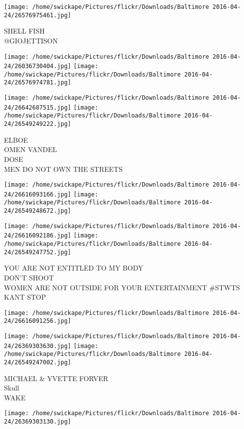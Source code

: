 \documentclass[10pt,letterpaper]{article}
\begin{document}
\vspace{0.25in}
\texttt{[image: /home/swickape/Pictures/flickr/Downloads/Baltimore 2016-04-24/26576975461.jpg]}

SHELL FISH\\
@GIOJETTISON
\pagebreak

\texttt{[image: /home/swickape/Pictures/flickr/Downloads/Baltimore 2016-04-24/26036730404.jpg]}
\texttt{[image: /home/swickape/Pictures/flickr/Downloads/Baltimore 2016-04-24/26576974781.jpg]}

\texttt{[image: /home/swickape/Pictures/flickr/Downloads/Baltimore 2016-04-24/26642687515.jpg]}
\texttt{[image: /home/swickape/Pictures/flickr/Downloads/Baltimore 2016-04-24/26549249222.jpg]}

ELBOE\\
OMEN VANDEL\\
DOSE\\
MEN DO NOT OWN THE STREETS
\pagebreak

\texttt{[image: /home/swickape/Pictures/flickr/Downloads/Baltimore 2016-04-24/26616093166.jpg]}
\texttt{[image: /home/swickape/Pictures/flickr/Downloads/Baltimore 2016-04-24/26549248672.jpg]}

\texttt{[image: /home/swickape/Pictures/flickr/Downloads/Baltimore 2016-04-24/26616092186.jpg]}
\texttt{[image: /home/swickape/Pictures/flickr/Downloads/Baltimore 2016-04-24/26549247752.jpg]}

YOU ARE NOT ENTITLED TO MY BODY\\
DON'T SHOOT\\
WOMEN ARE NOT OUTSIDE FOR YOUR ENTERTAINMENT \#STWTS\\
KANT STOP
\pagebreak

\texttt{[image: /home/swickape/Pictures/flickr/Downloads/Baltimore 2016-04-24/26616091256.jpg]}

\vspace{0.25in}
\texttt{[image: /home/swickape/Pictures/flickr/Downloads/Baltimore 2016-04-24/26369303630.jpg]}
\texttt{[image: /home/swickape/Pictures/flickr/Downloads/Baltimore 2016-04-24/26549247002.jpg]}

MICHAEL \& YVETTE FORVER\\
Skull\\
WAKE
\pagebreak

\texttt{[image: /home/swickape/Pictures/flickr/Downloads/Baltimore 2016-04-24/26369303130.jpg]}
\end{document}
